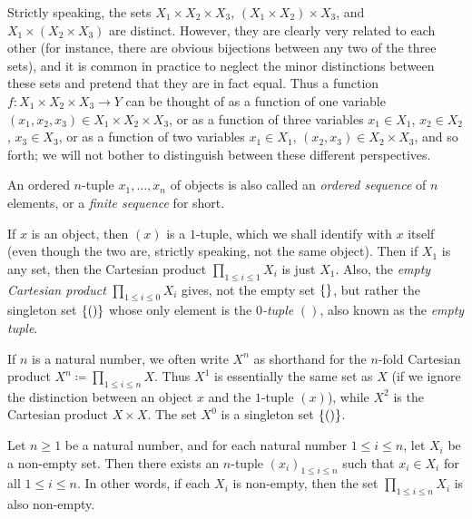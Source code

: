\begin{note}
	Strictly speaking, the sets \(X_1 \times X_2 \times X_3\), \((X_1 \times X_2) \times X_3\), and \(X_1 \times (X_2 \times X_3)\) are distinct.
	However, they are clearly very related to each other (for instance, there are obvious bijections between any two of the three sets), and it is common in practice to neglect the minor distinctions between these sets and pretend that they are in fact equal.
	Thus a function \(f : X_1 \times X_2 \times X_3 \to Y\) can be thought of as a function of one variable \((x_1, x_2, x_3) \in X_1 \times X_2 \times X_3\), or as a function of three variables \(x_1 \in X_1\), \(x_2 \in X_2\), \(x_3 \in X_3\), or as a function of two variables \(x_1 \in X_1\), \((x_2, x_3) \in X_2 \times X_3\), and so forth;
	we will not bother to distinguish between these different perspectives.
\end{note}

\setcounter{thm}{9}
\begin{rmk}\label{3.5.10}
	An ordered \(n\)-tuple \(x_1, \dots, x_n\) of objects is also called an \emph{ordered sequence} of \(n\) elements, or a \emph{finite sequence} for short.
\end{rmk}

\begin{note}
	If \(x\) is an object, then \((x)\) is a \(1\)-tuple, which we shall identify with \(x\) itself (even though the two are, strictly speaking, not the same object).
	Then if \(X_1\) is any set, then the Cartesian product \(\prod_{1 \leq i \leq 1} X_i\) is just \(X_1\).
	Also, the \emph{empty Cartesian product} \(\prod_{1 \leq i \leq 0} X_i\) gives, not the empty set \(\left\lbrace\right\rbrace\), but rather the singleton set \(\left\lbrace()\right\rbrace\) whose only element is the \emph{\(0\)-tuple} \(()\), also known as the \emph{empty tuple}.
\end{note}

\begin{note}
	If \(n\) is a natural number, we often write \(X^n\) as shorthand for the \(n\)-fold Cartesian product \(X^n \coloneqq \prod_{1 \leq i \leq n} X\).
	Thus \(X^1\) is essentially the same set as \(X\) (if we ignore the distinction between an object \(x\) and the \(1\)-tuple \((x)\)), while \(X^2\) is the Cartesian product \(X \times X\).
	The set \(X^0\) is a singleton set \(\left\lbrace()\right\rbrace\).
\end{note}

\setcounter{thm}{11}
\begin{lem}\label{3.5.12}
	Let \(n \geq 1\) be a natural number, and for each natural number \(1 \leq i \leq n\), let \(X_i\) be a non-empty set.
	Then there exists an \(n\)-tuple \((x_i)_{1 \leq i \leq n}\) such that \(x_i \in X_i\) for all \(1 \leq i \leq n\).
	In other words, if each \(X_i\) is non-empty, then the set \(\prod_{1 \leq i \leq n} X_i\) is also non-empty.
\end{lem}

